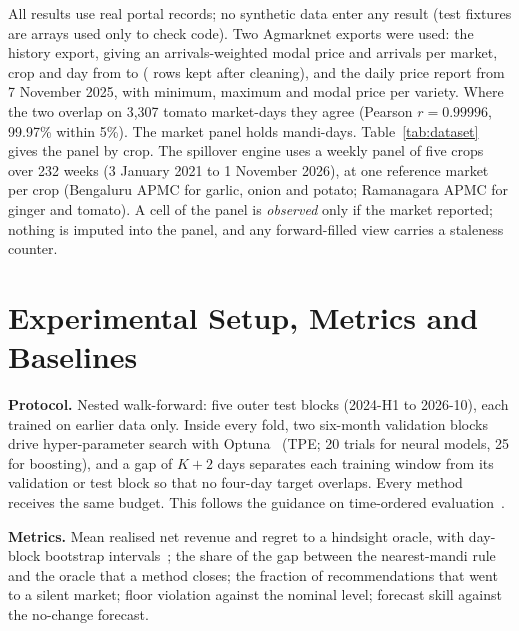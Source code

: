 All results use real portal records; no synthetic data enter any result (test fixtures are arrays used only to check code). Two Agmarknet exports were used: the history export, giving an arrivals-weighted modal price and arrivals per market, crop and day from \DataFrom{} to \DataTo{} (\NhistoryRows{} rows kept after cleaning), and the daily price report from 7 November 2025, with minimum, maximum and modal price per variety. Where the two overlap on 3,307 tomato market-days they agree (Pearson $r=0.99996$, 99.97\% within 5\%). The market panel holds \NpanelRows{} mandi-days. Table~\ref{tab:dataset} gives the panel by crop. The spillover engine uses a weekly panel of five crops over 232 weeks (3 January 2021 to 1 November 2026), at one reference market per crop (Bengaluru APMC for garlic, onion and potato; Ramanagara APMC for ginger and tomato). A cell of the panel is \emph{observed} only if the market reported; nothing is imputed into the panel, and any forward-filled view carries a staleness counter.

\begin{table}[!t]
\centering
\caption{Market panel by crop. ``Eligible'' counts markets with at least 700 reported days.}
\label{tab:dataset}
\end{table}

\section{Experimental Setup, Metrics and Baselines}
\label{sec:setup}

\noindent\textbf{Protocol.} Nested walk-forward: five outer test blocks (2024-H1 to 2026-10), each trained on earlier data only. Inside every fold, two six-month validation blocks drive hyper-parameter search with Optuna~\cite{akiba2019} (TPE; 20 trials for neural models, 25 for boosting), and a gap of $K{+}2$ days separates each training window from its validation or test block so that no four-day target overlaps. Every method receives the same budget. This follows the guidance on time-ordered evaluation~\cite{bergmeir2012,cerqueira2020}.

\noindent\textbf{Metrics.} Mean realised net revenue and regret to a hindsight oracle, with day-block bootstrap intervals~\cite{kunsch1989}; the share of the gap between the nearest-mandi rule and the oracle that a method closes; the fraction of recommendations that went to a silent market; floor violation against the nominal level; forecast skill against the no-change forecast.


